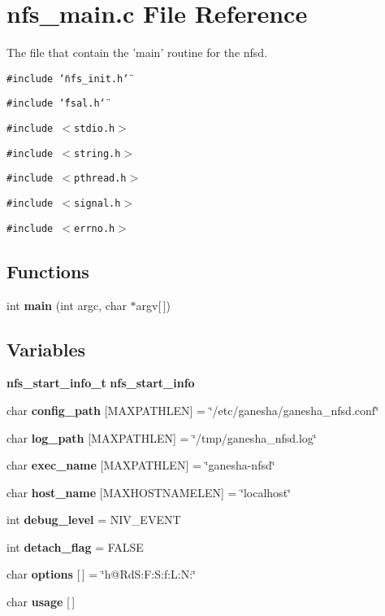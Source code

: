 \section{nfs\_\-main.c File Reference}
\label{nfs__main_8c}
The file that contain the 'main' routine for the nfsd. 

{\tt \#include \char`\"{}nfs\_\-init.h\char`\"{}}\par
{\tt \#include \char`\"{}fsal.h\char`\"{}}\par
{\tt \#include $<$stdio.h$>$}\par
{\tt \#include $<$string.h$>$}\par
{\tt \#include $<$pthread.h$>$}\par
{\tt \#include $<$signal.h$>$}\par
{\tt \#include $<$errno.h$>$}\par
\subsection*{Functions}
\begin{CompactItemize}
\item 
int {\bf main} (int argc, char $\ast$argv[$\,$])
\end{CompactItemize}
\subsection*{Variables}
\begin{CompactItemize}
\item 
{\bf nfs\_\-start\_\-info\_\-t} {\bf nfs\_\-start\_\-info}
\item 
char {\bf config\_\-path} [MAXPATHLEN] = \char`\"{}/etc/ganesha/ganesha\_\-nfsd.conf\char`\"{}
\item 
char {\bf log\_\-path} [MAXPATHLEN] = \char`\"{}/tmp/ganesha\_\-nfsd.log\char`\"{}
\item 
char {\bf exec\_\-name} [MAXPATHLEN] = \char`\"{}ganesha-nfsd\char`\"{}
\item 
char {\bf host\_\-name} [MAXHOSTNAMELEN] = \char`\"{}localhost\char`\"{}
\item 
int {\bf debug\_\-level} = NIV\_\-EVENT
\item 
int {\bf detach\_\-flag} = FALSE
\item 
char {\bf options} [$\,$] = \char`\"{}h@Rd\-S:F:S:f:L:N:\char`\"{}
\item 
char {\bf usage} [$\,$]
\end{CompactItemize}


